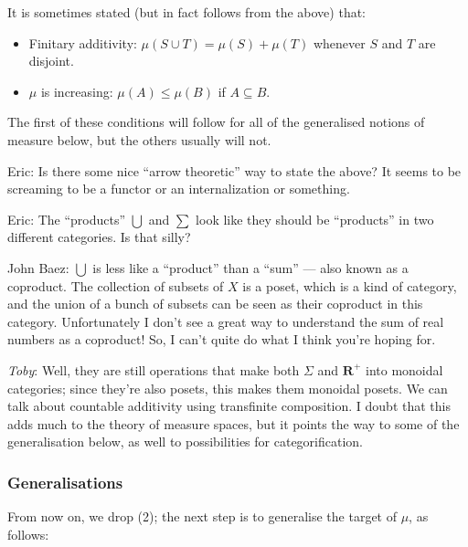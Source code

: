 \documentclass[preprint, 5p, 10pt]{elsarticle}
\theoremstyle{plain}
\begin{document}
It is sometimes stated (but in fact follows from the above) that:

\begin{itemize}%
\item Finitary additivity: $\mu(S \cup T) = \mu(S) + \mu(T)$ whenever $S$ and $T$ are disjoint.
\item $\mu$ is increasing: $\mu(A) \leq \mu(B)$ if $A \subseteq B$.

\end{itemize}
The first of these conditions will follow for all of the generalised notions of measure below, but the others usually will not.

Eric: Is there some nice ``{}arrow theoretic''{} way to state the above? It seems to be screaming to be a functor or an internalization or something.

Eric: The ``{}products''{} $\bigcup$ and $\sum$ look like they should be ``{}products''{} in two different categories. Is that silly?

John Baez: $\bigcup$ is less like a ``{}product''{} than a ``{}sum''{} ---{} also known as a coproduct. The collection of subsets of $X$ is a poset, which is a kind of category, and the union of a bunch of subsets can be seen as their coproduct in this category. Unfortunately I don'{}t see a great way to understand the sum of real numbers as a coproduct! So, I can'{}t quite do what I think you'{}re hoping for.

\emph{Toby}: Well, they are still operations that make both $\Sigma$ and $\mathbf{R}^+$ into monoidal categories; since they'{}re also posets, this makes them monoidal posets. We can talk about countable additivity using transfinite composition. I doubt that this adds much to the theory of measure spaces, but it points the way to some of the generalisation below, as well to possibilities for categorification.

\hypertarget{generalisations_7}{}\subsubsection*{{Generalisations}}\label{generalisations_7}

From now on, we drop (2); the next step is to generalise the target of $\mu$, as follows:
\end{document}
